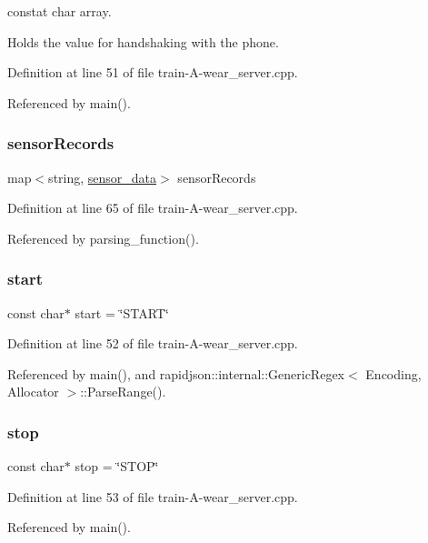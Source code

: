 constat char array. 

Holds the value for handshaking with the phone. 

Definition at line 51 of file train-\/\+A-\/wear\+\_\+server.\+cpp.



Referenced by main().

\mbox{\label{train-_a-wear__server_8cpp_ac46b8bbbac4148e54db22486817eb63d}} 
\subsubsection{\texorpdfstring{sensorRecords}{sensorRecords}}
{\footnotesize\ttfamily map$<$string, \mbox{\hyperlink{structsensor__data}{sensor\+\_\+data}}$>$ sensor\+Records}



Definition at line 65 of file train-\/\+A-\/wear\+\_\+server.\+cpp.



Referenced by parsing\+\_\+function().

\mbox{\label{train-_a-wear__server_8cpp_ac621bcfb466f3b6a6421c5f48b30ade3}} 
\subsubsection{\texorpdfstring{start}{start}}
{\footnotesize\ttfamily const char$\ast$ start = \char`\"{}S\+T\+A\+RT\char`\"{}}



Definition at line 52 of file train-\/\+A-\/wear\+\_\+server.\+cpp.



Referenced by main(), and rapidjson\+::internal\+::\+Generic\+Regex$<$ Encoding, Allocator $>$\+::\+Parse\+Range().

\mbox{\label{train-_a-wear__server_8cpp_a94c0a5a6a2bfcdd03883cd7d72bbaa86}} 
\subsubsection{\texorpdfstring{stop}{stop}}
{\footnotesize\ttfamily const char$\ast$ stop = \char`\"{}S\+T\+OP\char`\"{}}



Definition at line 53 of file train-\/\+A-\/wear\+\_\+server.\+cpp.



Referenced by main().

